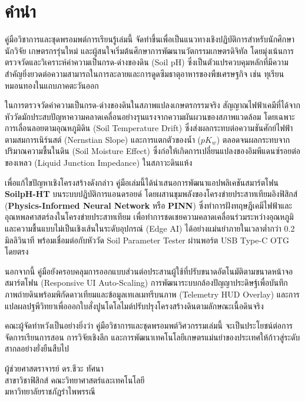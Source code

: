 \chapter*{คำนำ}

คู่มือวิชาการและชุดพรอมพต์การเรียนรู้เล่มนี้ จัดทำขึ้นเพื่อเป็นแนวทางเชิงปฏิบัติการสำหรับนักศึกษา นักวิจัย เกษตรกรรุ่นใหม่ และผู้สนใจเริ่มต้นศึกษาการพัฒนานวัตกรรมเกษตรดิจิทัล โดยมุ่งเน้นการตรวจวัดและวิเคราะห์ค่าความเป็นกรด-ด่างของดิน (Soil pH) ซึ่งเป็นตัวแปรควบคุมหลักที่มีความสำคัญยิ่งยวดต่อความสามารถในการละลายและการดูดซึมธาตุอาหารของพืชเศรษฐกิจ เช่น ทุเรียนหมอนทองในแถบภาคตะวันออก

ในการตรวจวัดค่าความเป็นกรด-ด่างของดินในสภาพแปลงเกษตรกรรมจริง สัญญาณไฟฟ้าเคมีที่ได้จากหัววัดมักประสบปัญหาความคลาดเคลื่อนอย่างรุนแรงจากความผันผวนของสภาพแวดล้อม โดยเฉพาะการเลื่อนลอยตามอุณหภูมิดิน (Soil Temperature Drift) ซึ่งส่งผลกระทบต่อความชันศักย์ไฟฟ้าตามสมการเนิร์นสต์ (Nernstian Slope) และการแตกตัวของน้ำ ($pK_w$) ตลอดจนผลกระทบจากปริมาณความชื้นในดิน (Soil Moisture Effect) ซึ่งก่อให้เกิดการเปลี่ยนแปลงของอิมพีแดนซ์รอยต่อของเหลว (Liquid Junction Impedance) ในสภาวะดินแห้ง

เพื่อแก้ไขปัญหาเชิงโครงสร้างดังกล่าว คู่มือเล่มนี้ได้นำเสนอการพัฒนาแอปพลิเคชันสมาร์ตโฟน \textbf{SoilpH-HT} บนระบบปฏิบัติการแอนดรอยด์ โดยผสานขุมพลังของโครงข่ายประสาทเทียมอิงฟิสิกส์ (\textbf{Physics-Informed Neural Network} หรือ \textbf{PINN}) ซึ่งทำการฝังทฤษฎีเคมีไฟฟ้าและอุณหพลศาสตร์ลงในโครงข่ายประสาทเทียม เพื่อทำการชดเชยความคลาดเคลื่อนร่วมระหว่างอุณหภูมิและความชื้นแบบไม่เป็นเชิงเส้นในระดับอุปกรณ์ (Edge AI) ได้อย่างแม่นยำภายในเวลาต่ำกว่า 0.2 มิลลิวินาที พร้อมเชื่อมต่อกับหัววัด Soil Parameter Tester ผ่านพอร์ต USB Type-C OTG โดยตรง

นอกจากนี้ คู่มือยังครอบคลุมการออกแบบส่วนต่อประสานผู้ใช้ที่ปรับขนาดอัตโนมัติตามขนาดหน้าจอสมาร์ตโฟน (Responsive UI Auto-Scaling) การพัฒนาระบบกล้องปัญญาประดิษฐ์เพื่อบันทึกภาพถ่ายดินพร้อมพิกัดดาวเทียมและข้อมูลเทเลเมทรีบนภาพ (Telemetry HUD Overlay) และการแปลผลปฐพีวิทยาเพื่อออกใบสั่งปูนโดโลไมต์ปรับปรุงโครงสร้างดินตามลักษณะเนื้อดินจริง

คณะผู้จัดทำหวังเป็นอย่างยิ่งว่า คู่มือวิชาการและชุดพรอมพต์วิศวกรรมเล่มนี้ จะเป็นประโยชน์ต่อการจัดการเรียนการสอน การวิจัยเชิงลึก และการพัฒนาเทคโนโลยีเกษตรแม่นยำของประเทศให้ก้าวสู่ระดับสากลอย่างยั่งยืนสืบไป

\vspace{1.5cm}
\begin{flushright}
    ผู้ช่วยศาสตราจารย์ ดร.ชีวะ ทัศนา\\
    สาขาวิชาฟิสิกส์ คณะวิทยาศาสตร์และเทคโนโลยี\\
    มหาวิทยาลัยราชภัฏรำไพพรรณี
\end{flushright}
